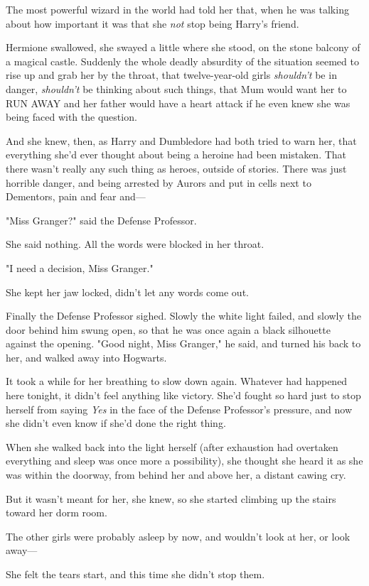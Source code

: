 The most powerful wizard in the world had told her that, when he was talking
about how important it was that she \emph{not} stop being Harry's friend.

Hermione swallowed, she swayed a little where she stood, on the stone balcony
of a magical castle. Suddenly the whole deadly absurdity of the situation
seemed to rise up and grab her by the throat, that twelve-year-old girls
\emph{shouldn't} be in danger, \emph{shouldn't} be thinking about such things,
that Mum would want her to RUN AWAY and her father would have a heart attack if
he even knew she was being faced with the question.

And she knew, then, as Harry and Dumbledore had both tried to warn her, that
everything she'd ever thought about being a heroine had been mistaken. That
there wasn't really any such thing as heroes, outside of stories. There was
just horrible danger, and being arrested by Aurors and put in cells next to
Dementors, pain and fear and---

"Miss Granger?" said the Defense Professor.

She said nothing. All the words were blocked in her throat.

"I need a decision, Miss Granger."

She kept her jaw locked, didn't let any words come out.

Finally the Defense Professor sighed. Slowly the white light failed, and slowly
the door behind him swung open, so that he was once again a black silhouette
against the opening. "Good night, Miss Granger," he said, and turned his back
to her, and walked away into Hogwarts.

It took a while for her breathing to slow down again. Whatever had happened
here tonight, it didn't feel anything like victory. She'd fought so hard just
to stop herself from saying \emph{Yes} in the face of the Defense Professor's
pressure, and now she didn't even know if she'd done the right thing.

When she walked back into the light herself (after exhaustion had overtaken
everything and sleep was once more a possibility), she thought she heard it as
she was within the doorway, from behind her and above her, a distant cawing cry.

But it wasn't meant for her, she knew, so she started climbing up the stairs
toward her dorm room.

The other girls were probably asleep by now, and wouldn't look at her, or look
away---

She felt the tears start, and this time she didn't stop them.
